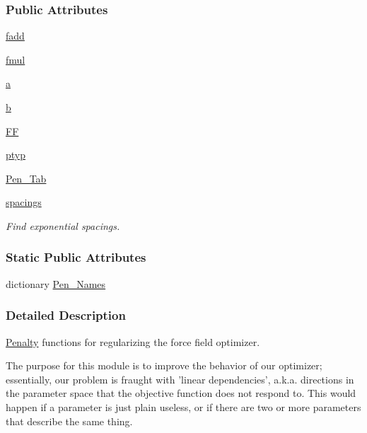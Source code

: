 \subsubsection*{\-Public \-Attributes}
\begin{DoxyCompactItemize}
\item 
\hyperlink{classforcebalance_1_1objective_1_1Penalty_a29f26a2c093d2bff5514e246130d6a53}{fadd}
\item 
\hyperlink{classforcebalance_1_1objective_1_1Penalty_a817fa1ce79cc4658d81e7e1d628dad00}{fmul}
\item 
\hyperlink{classforcebalance_1_1objective_1_1Penalty_a27d10ae4d7dc4691170456ca7c2208c7}{a}
\item 
\hyperlink{classforcebalance_1_1objective_1_1Penalty_a90c9d0618d160aac6d2b30643087eb1c}{b}
\item 
\hyperlink{classforcebalance_1_1objective_1_1Penalty_a1280094f47322c26c0ed2327d55d2bf9}{\-F\-F}
\item 
\hyperlink{classforcebalance_1_1objective_1_1Penalty_a8d4f7ac9e3dcd3a55fc2f175ee100a98}{ptyp}
\item 
\hyperlink{classforcebalance_1_1objective_1_1Penalty_a205b8adaf51199f59e18785806ffc567}{\-Pen\-\_\-\-Tab}
\item 
\hyperlink{classforcebalance_1_1objective_1_1Penalty_a8faf40a164789edd6c5b6863892abef4}{spacings}
\begin{DoxyCompactList}\small\item\em \-Find exponential spacings. \end{DoxyCompactList}\end{DoxyCompactItemize}
\subsubsection*{\-Static \-Public \-Attributes}
\begin{DoxyCompactItemize}
\item 
dictionary \hyperlink{classforcebalance_1_1objective_1_1Penalty_aad5192e4b92742dbe94fceb4144cebf9}{\-Pen\-\_\-\-Names}
\end{DoxyCompactItemize}


\subsubsection{\-Detailed \-Description}
\hyperlink{classforcebalance_1_1objective_1_1Penalty}{\-Penalty} functions for regularizing the force field optimizer. 

\-The purpose for this module is to improve the behavior of our optimizer; essentially, our problem is fraught with 'linear dependencies', a.\-k.\-a. directions in the parameter space that the objective function does not respond to. \-This would happen if a parameter is just plain useless, or if there are two or more parameters that describe the same thing.

